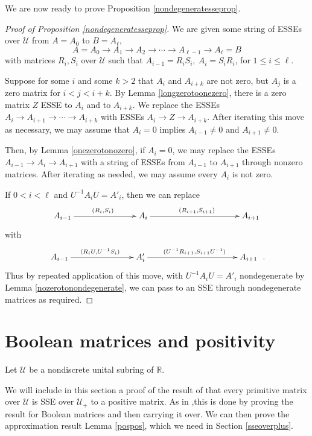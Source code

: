 \documentclass{amsart}
\theoremstyle{definition}
\theoremstyle{remark}
\numberwithin{equation}{section}
\begin{document}
{{We are now ready to prove Proposition 
\ref{nondegeneratesseprop}. 

\begin{proof}[Proof of Proposition \ref{nondegeneratesseprop}] 
We are given some string of ESSEs over $\mathcal U$ from $A=A_0$ to
$B=A_{\ell}$, 
\[
A=A_0 \to A_1 \to A_2 \to \cdots \to A_{\ell -1} \to A_{\ell}=B  
\] 
with matrices $R_i,S_i$ over $\mathcal U$ such that 
$A_{i-1}=R_iS_i, \ A_{i}= S_iR_i$, for $1\leq i \leq \ell$. 

Suppose for some $i$ and some $k>2$ that $A_i$ and $A_{i+k}$ are 
not zero, but $A_j$ is a zero matrix for $i<j<i+k$. 
By Lemma \ref{longzerotoonezero}, 
there is a zero matrix $Z$ ESSE to $A_i$ and to $A_{i+k}$. 
We replace the ESSEs 
$A_i \to A_{i+1} \to \cdots \to A_{i+k}$ 
with ESSEs $A_i\to Z \to A_{i+k}$. After iterating this 
move as necessary, we may assume that $A_i=0 $
implies $A_{i-1}\neq 0$ and $A_{i+1}\neq 0$.  

Then, by Lemma \ref{onezerotonozero}, if $A_i=0$, 
we may replace the ESSEs $A_{i-1} \to A_i\to A_{i+1}$ 
with a string of ESSEs from $A_{i-1}$ to $A_{i+1}$  through nonzero 
matrices. After iterating as needed, we may assume every $A_i$
is not zero. 

If $0< i< \ell$ and 
$U^{-1}A_iU=A'_i$, then we can replace 
\begin{equation}
\xymatrix@=
10pt{
A_{i-1} 
\ar^{(R_i,S_i)}[rrrrr] &&&&& A_i 
\ar^{(R_{i+1},S_{i+1})}[rrrrrrr]&&&&&&&  A_{i+1}  
}
\end{equation}
with 
\begin{equation}
\xymatrix@=
10pt{
A_{i-1} 
\ar^{(R_iU,U^{-1}S_i)}[rrrrr] &&&&& A'_i 
\ar^{(U^{-1}R_{i+1},S_{i+1}U^{-1})}[rrrrrrr]&&&&&&&  A_{i+1}  
}\ . 
\end{equation}
Thus by repeated application of this move, with 
$U^{-1}A_iU=A'_i$ nondegenerate by Lemma \ref{nozerotonondegenerate}, 
we can pass to an SSE through nondegenerate matrices as required. 
\end{proof} 

\section{Boolean matrices and positivity } \label{booleanappendix} 

Let $\mathcal U$ be a nondiscrete unital subring of $\mathbb R$. 

We will include in this section a proof 
of the result of \cite{KR0} that every 
primitive matrix over $\mathcal U$ is SSE over $\mathcal U_+$ to a 
positive matrix. 
As in  \cite{KR0},this is done by proving the result for Boolean 
matrices and then carrying it over. 
We can then prove the approximation result Lemma 
\ref{pospos}, which we need  in Section 
\ref{sseoverplus}.

}}
\end{document}
